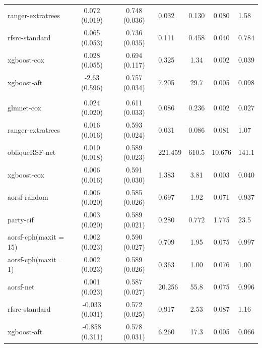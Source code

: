 \documentclass[twoside,11pt]{article}\usepackage[]{graphicx}\usepackage[]{color}
\newenvironment{knitrout}{}{} %
\begin{document}
\begin{knitrout}
\begin{longtable}{lcclccl}
\hspace{1em}ranger-extratrees & 0.072 (0.019) & 0.748 (0.036) & 0.032 & 0.130 & 0.080 & 1.58\\
\hspace{1em}rfsrc-standard & 0.065 (0.053) & 0.736 (0.035) & 0.111 & 0.458 & 0.040 & 0.784\\
\hspace{1em}xgboost-cox & 0.028 (0.055) & 0.694 (0.117) & 0.325 & 1.34 & 0.002 & 0.039\\
\hspace{1em}xgboost-aft & -2.63 (0.596) & 0.757 (0.034) & 7.205 & 29.7 & 0.005 & 0.098\\
\addlinespace[0.3em]
\hline
\multicolumn{7}{l}{\textit{\textbf{FCL; relapse, n = 541, p = 7}}}\\
\hline
\hspace{1em}glmnet-cox & 0.024 (0.020) & 0.611 (0.033) & 0.086 & 0.236 & 0.002 & 0.027\\
\hspace{1em}ranger-extratrees & 0.016 (0.016) & 0.593 (0.024) & 0.031 & 0.086 & 0.081 & 1.07\\
\hspace{1em}obliqueRSF-net & 0.010 (0.018) & 0.589 (0.023) & 221.459 & 610.5 & 10.676 & 141.1\\
\hspace{1em}xgboost-cox & 0.006 (0.016) & 0.591 (0.030) & 1.383 & 3.81 & 0.003 & 0.040\\
\hspace{1em}aorsf-random & 0.006 (0.020) & 0.585 (0.026) & 0.697 & 1.92 & 0.071 & 0.937\\
\hspace{1em}party-cif & 0.003 (0.020) & 0.589 (0.021) & 0.280 & 0.772 & 1.775 & 23.5\\
\hspace{1em}aorsf-cph(maxit = 15) & 0.002 (0.023) & 0.590 (0.027) & 0.709 & 1.95 & 0.075 & 0.997\\
\hspace{1em}aorsf-cph(maxit = 1) & 0.002 (0.023) & 0.589 (0.026) & 0.363 & 1.00 & 0.076 & 1.00\\
\hspace{1em}aorsf-net & 0.001 (0.023) & 0.587 (0.027) & 20.256 & 55.8 & 0.075 & 0.996\\
\hspace{1em}rfsrc-standard & -0.033 (0.031) & 0.572 (0.025) & 0.917 & 2.53 & 0.087 & 1.16\\
\hspace{1em}xgboost-aft & -0.858 (0.311) & 0.578 (0.031) & 6.260 & 17.3 & 0.005 & 0.066\\

\end{longtable}
\end{knitrout}
\end{document}

